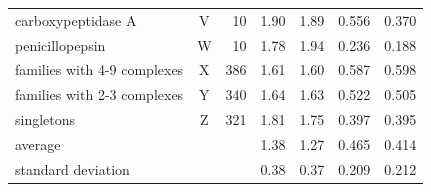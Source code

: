 \begin{table}
\begin{tabular}{lcrrrrr}
carboxypeptidase A             & V &  10 & 1.90 & 1.89 & 0.556 & 0.370\\
penicillopepsin                & W &  10 & 1.78 & 1.94 & 0.236 & 0.188\\
families with 4-9 complexes    & X & 386 & 1.61 & 1.60 & 0.587 & 0.598\\
families with 2-3 complexes    & Y & 340 & 1.64 & 1.63 & 0.522 & 0.505\\
singletons                     & Z & 321 & 1.81 & 1.75 & 0.397 & 0.395\\
average                        &   &     & 1.38 & 1.27 & 0.465 & 0.414\\
standard deviation             &   &     & 0.38 & 0.37 & 0.209 & 0.212\\
\hline
\end{tabular}
\end{table}

